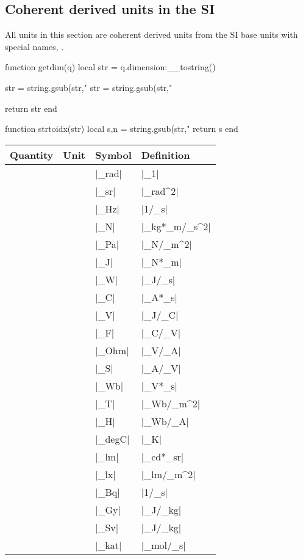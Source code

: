 \documentclass{ltxdoc}
\newcommand\thead[1]{#1}
\begin{document}
\newpage
\subsection{Coherent derived units in the SI}
\label{ch:coherent derived units}

All units in this section are coherent derived units from the SI base units with special names, \cite[118]{bipm06}. 

\begin{luacode}
function getdim(q)
  local str = q.dimension:__tostring()
  
  str = string.gsub(str,"%
  str = string.gsub(str,"%

  return str
end

function strtoidx(str)
  local s,n = string.gsub(str,"%
  return s
end
\end{luacode}

\newcommand{\unittable}[1]{
  \begin{table}[H]
  \centering
  \begin{tabularx}{\linewidth}{%
    >{\setlength\hsize{1\hsize}}X%
    l%
    l%
    >{\setlength\hsize{1\hsize}}X%
  }
  \thead{Quantity} & \thead{Unit} & \thead{Symbol} & \thead{Definition} \\\hline

  #1

  \hline
  \end{tabularx}
  \end{table}
}

\newcommand{\printunit}[3][]{
  \ifthenelse{\equal{#1}{}}{
    \directlua{tex.print(getdim(#2))}
  }{
    #1
  } &
  \directlua{tex.print(#2.unit.name)} & 
  |#2| &
  \mbox{|#3|}\index[unit]{\directlua{tex.print(#2.unit.name)} \texttt{\directlua{tex.print( strtoidx("#2") )}}} \\
}

\unittable{
  \printunit[Plane Angle\protect\footnotemark]{_rad}{_1}
  \printunit[Solid Angle\protect\footnotemark]{_sr}{_rad^2}
  \printunit{_Hz}{1/_s}
  \printunit{_N}{_kg*_m/_s^2}
  \printunit{_Pa}{_N/_m^2}
  \printunit[Energy]{_J}{_N*_m}
  \printunit{_W}{_J/_s}
  \printunit{_C}{_A*_s}
  \printunit{_V}{_J/_C}
  \printunit{_F}{_C/_V}
  \printunit{_Ohm}{_V/_A}
  \printunit[Electric Conductance\protect\footnotemark]{_S}{_A/_V}
  \printunit{_Wb}{_V*_s}
  \printunit{_T}{_Wb/_m^2}
  \printunit{_H}{_Wb/_A}
  \printunit[Temperature\protect\footnotemark]{_degC}{_K}
  \printunit[Luminous Flux]{_lm}{_cd*_sr}
  \printunit{_lx}{_lm/_m^2}
  \printunit[Activity]{_Bq}{1/_s}
  \printunit{_Gy}{_J/_kg}
  \printunit[Dose Equivalent]{_Sv}{_J/_kg}
  \printunit{_kat}{_mol/_s}
}
\end{document}

